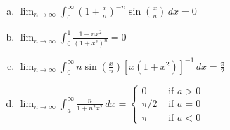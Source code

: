 \documentclass{article}
\begin{document}
\begin{enumerate}[(a)]
\item $\displaystyle \lim_{n\to \infty} \int_0^\infty \left( 1 + \frac x n \right)^{-n} \sin \left(\frac x n \right) \, dx = 0$
\item $\displaystyle \lim_{n \to \infty} \int_0^1 \frac{1 + n x^2} {(1 + x^2)^n} = 0$
\item $ \displaystyle \lim_{n \to \infty} \int_0^\infty n \sin \left( \frac x n \right) [x(1+x^2)]^{-1} \, dx = \frac \pi 2$
\item $ \displaystyle \lim_{n \to \infty} \int_a^\infty \frac n {1 + n^2 x^2} \, dx= \left\{
\begin{array}{ll}
   0 & \text{ if } a > 0
\\ \pi/2 & \text{ if } a = 0
\\ \pi  & \text{ if } a < 0
\end{array} \right.
$
\end{enumerate}
\end{document}
